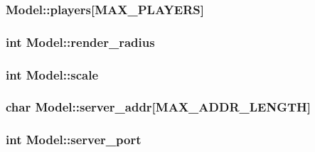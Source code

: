 \subsubsection[{\texorpdfstring{players}{players}}]{ Model\+::players\mbox{[}{\bf M\+A\+X\+\_\+\+P\+L\+A\+Y\+E\+RS}\mbox{]}}\hypertarget{structModel_a35889c6e0321e390c7cc35678b561f0c}{}\label{structModel_a35889c6e0321e390c7cc35678b561f0c}
\subsubsection[{\texorpdfstring{render\+\_\+radius}{render_radius}}]{\setlength{\rightskip}{0pt plus 5cm}int Model\+::render\+\_\+radius}\hypertarget{structModel_a78738d6f90d8a11202fec26912dddcde}{}\label{structModel_a78738d6f90d8a11202fec26912dddcde}
\subsubsection[{\texorpdfstring{scale}{scale}}]{\setlength{\rightskip}{0pt plus 5cm}int Model\+::scale}\hypertarget{structModel_a2e5100141918bee00883703185ed79cd}{}\label{structModel_a2e5100141918bee00883703185ed79cd}
\subsubsection[{\texorpdfstring{server\+\_\+addr}{server_addr}}]{\setlength{\rightskip}{0pt plus 5cm}char Model\+::server\+\_\+addr\mbox{[}{\bf M\+A\+X\+\_\+\+A\+D\+D\+R\+\_\+\+L\+E\+N\+G\+TH}\mbox{]}}\hypertarget{structModel_a945af3964810abe23abf7324a3da1b35}{}\label{structModel_a945af3964810abe23abf7324a3da1b35}
\subsubsection[{\texorpdfstring{server\+\_\+port}{server_port}}]{\setlength{\rightskip}{0pt plus 5cm}int Model\+::server\+\_\+port}\hypertarget{structModel_ac47fe750112140fe346c32524bf1121b}{}\label{structModel_ac47fe750112140fe346c32524bf1121b}
